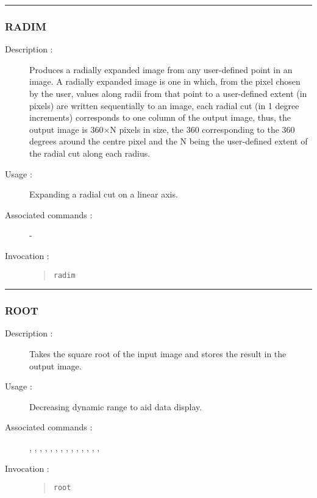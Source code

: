\hrule 
\subsubsection*{\label{RADIM}RADIM}

\begin{description}

\item[Description :] Produces a radially expanded image from any
user-defined point in an image.  A radially expanded image is one in
which, from the pixel chosen by the user, values along radii from that
point to a user-defined extent (in pixels) are written sequentially to
an image, each radial cut (in 1 degree increments) corresponds to one
column of the output image, thus, the output image is 360$\times$N
pixels in size, the 360 corresponding to the 360 degrees around the
centre pixel and the N being the user-defined extent of the radial cut
along each radius.

\item[Usage :] Expanding a radial cut on a linear axis.
\item[Associated commands :] -
\item[Invocation :]

\begin{quote}{\tt  radim }\end{quote}

\end{description}

\hrule 
\subsubsection*{\label{ROOT}ROOT}

\begin{description}

\item[Description :] Takes the square root of the input image and
stores the result in the output image.

\item[Usage :] Decreasing dynamic range to aid data display.

\item[Associated commands :] {\tt {}}, 
{\tt {}}, {\tt {}}, 
{\tt {}}, {\tt {}}, 
{\tt {}}, {\tt {}}, 
{\tt {}}, {\tt {}}, 
{\tt {}}, {\tt {}}, 
{\tt {}}, {\tt {}}, 
{\tt {}}, {\tt {}}

\item[Invocation :]

\begin{quote}{\tt root }\end{quote}

\end{description}

